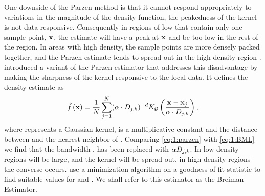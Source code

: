 One downside of the Parzen method is that it cannot respond appropriately to variations in the magnitude of the density function, \ie the peakedness of the kernel is not data-responsive. Consequently in regions of low \varDensityFunction{\varPattern} that contain only one sample point, $\varPattern$, the estimate will have a peak at $\varPattern$ and be too low in the rest of the region. In areas with high density, the sample points are more densely packed together, and the Parzen estimate tends to spread out in the high density region \cite{breiman1977variable}. \citeauthor{breiman1977variable} introduced a variant of the Parzen estimator that addresses this disadvantage by making the sharpness of the kernel responsive to the local data. It defines the density estimate as
\begin{equation}\label{eq:1:BML}
 	\varEstimatedDensityFunction{\varPattern} = \frac{1}{\varNumPatterns} \sum_{j = 1}^{\varNumPatterns} (\varBMLconstant \cdot \varKNNDistance{j}{k})^{-\varDim} \varKernel[\varGaussian]{\frac{\varPattern - \varPattern[j]}{\varBMLconstant \cdot \varKNNDistance{j}{k}}},
\end{equation} 
%
where \varKernel[\varGaussian]{\cdot} represents a Gaussian kernel, \varBMLconstant is a multiplicative constant and  the distance between \varPattern[j] and the \KNNK nearest neighbor of \varPattern[j]. Comparing \cref{eq:1:parzen} with \eqref{eq:1:BML} we find that the bandwidth \varBandwidth, has been replaced with $\alpha D_{j, k}$.  In low density regions  will be large, and the kernel will be spread out, in high density regions the converse occurs. \citeauthor{breiman1977variable} use a minimization algorithm on a goodness of fit statistic to find suitable values for \KNNK and \varBMLconstant. We shall refer to this estimator as the Breiman Estimator. 

